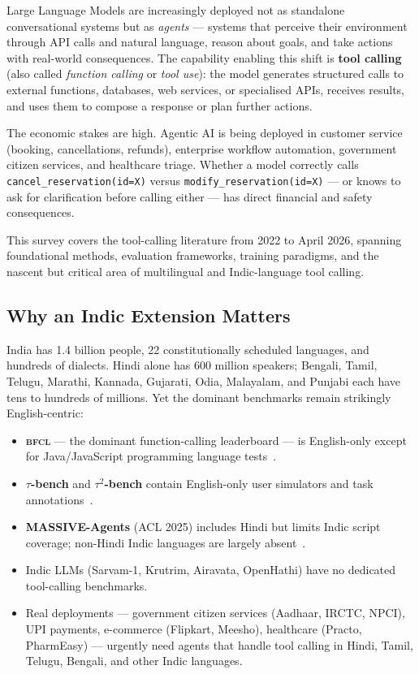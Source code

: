 \documentclass[11pt]{article}
\newcommand{\taubench}{$\tau$-bench}
\newcommand{\tautwobench}{$\tau^2$-bench}
\newcommand{\bfcl}{\textsc{bfcl}}
\begin{document}
Large Language Models are increasingly deployed not as standalone conversational systems but as
\emph{agents} --- systems that perceive their environment through API calls and natural language,
reason about goals, and take actions with real-world consequences. The capability enabling this shift
is \textbf{tool calling} (also called \emph{function calling} or \emph{tool use}): the model
generates structured calls to external functions, databases, web services, or specialised APIs,
receives results, and uses them to compose a response or plan further actions.

The economic stakes are high. Agentic AI is being deployed in customer service (booking,
cancellations, refunds), enterprise workflow automation, government citizen services, and healthcare
triage. Whether a model correctly calls \texttt{cancel\_reservation(id=X)} versus
\texttt{modify\_reservation(id=X)} --- or knows to ask for clarification before calling either ---
has direct financial and safety consequences.

This survey covers the tool-calling literature from 2022 to April 2026, spanning foundational
methods, evaluation frameworks, training paradigms, and the nascent but critical area of multilingual
and Indic-language tool calling.

\subsection{Why an Indic Extension Matters}

India has 1.4 billion people, 22 constitutionally scheduled languages, and hundreds of dialects.
Hindi alone has 600 million speakers; Bengali, Tamil, Telugu, Marathi, Kannada, Gujarati, Odia,
Malayalam, and Punjabi each have tens to hundreds of millions. Yet the dominant benchmarks remain
strikingly English-centric:

\begin{itemize}[leftmargin=1.2em, itemsep=2pt]
  \item \textbf{\bfcl{}} --- the dominant function-calling leaderboard --- is English-only except
        for Java/JavaScript programming language tests~\citep{patil2025bfcl}.
  \item \textbf{\taubench{}} and \textbf{\tautwobench{}} contain English-only user simulators and
        task annotations~\citep{yao2024taubench,barres2025tau2}.
  \item \textbf{MASSIVE-Agents} (ACL 2025) includes Hindi but limits Indic script coverage;
        non-Hindi Indic languages are largely absent~\citep{massiveagents2025}.
  \item Indic LLMs (Sarvam-1, Krutrim, Airavata, OpenHathi) have no dedicated tool-calling
        benchmarks.
  \item Real deployments --- government citizen services (Aadhaar, IRCTC, NPCI), UPI payments,
        e-commerce (Flipkart, Meesho), healthcare (Practo, PharmEasy) --- urgently need agents that
        handle tool calling in Hindi, Tamil, Telugu, Bengali, and other Indic languages.
\end{itemize}
\end{document}
